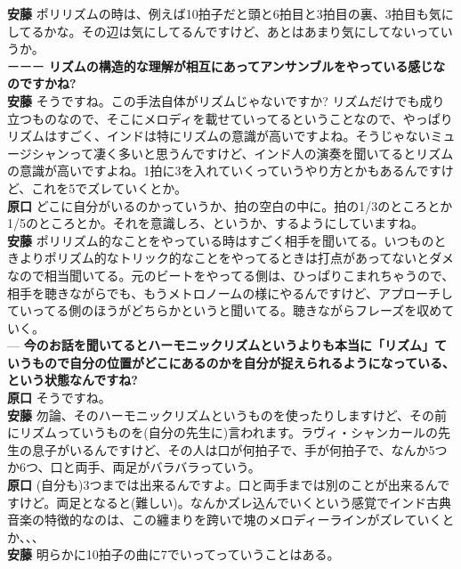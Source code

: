 \documentclass[uplatex,dvipdfmx]{ujarticle}
\begin{document}
\begin{description}
{\bf 安藤} ポリリズムの時は、例えば10拍子だと頭と6拍目と3拍目の裏、3拍目も気にしてるかな。その辺は気にしてるんですけど、あとはあまり気にしてないっていうか。\\

ーーー {\bf リズムの構造的な理解が相互にあってアンサンブルをやっている感じなのですかね?}\\

{\bf 安藤} そうですね。この手法自体がリズムじゃないですか? リズムだけでも成り立つものなので、そこにメロディを載せていってるということなので、やっぱりリズムはすごく、インドは特にリズムの意識が高いですよね。そうじゃないミュージシャンって凄く多いと思うんですけど、インド人の演奏を聞いてるとリズムの意識が高いですよね。1拍に3を入れていくっていうやり方とかもあるんですけど、これを5でズレていくとか。\\

{\bf 原口} どこに自分がいるのかっていうか、拍の空白の中に。拍の1/3のところとか1/5のところとか。それを意識しろ、というか、するようにしていますね。\\

{\bf 安藤} ポリリズム的なことをやっている時はすごく相手を聞いてる。いつものときよりポリズム的なトリック的なことをやってるときは打点があってないとダメなので相当聞いてる。元のビートをやってる側は、ひっぱりこまれちゃうので、相手を聴きながらでも、もうメトロノームの様にやるんですけど、アプローチしていってる側のほうがどちらかというと聞いてる。聴きながらフレーズを収めていく。\\

--- {\bf 今のお話を聞いてるとハーモニックリズムというよりも本当に「リズム」ていうもので自分の位置がどこにあるのかを自分が捉えられるようになっている、という状態なんですね?}\\

{\bf 原口} そうですね。\\

{\bf 安藤} 勿論、そのハーモニックリズムというものを使ったりしますけど、その前にリズムっていうものを(自分の先生に)言われます。ラヴィ・シャンカールの先生の息子がいるんですけど、その人は口が何拍子で、手が何拍子で、なんか5つか6つ、口と両手、両足がバラバラっていう。\\

{\bf 原口} (自分も)3つまでは出来るんですよ。口と両手までは別のことが出来るんですけど。両足となると(難しい)。なんかズレ込んでいくという感覚でインド古典音楽の特徴的なのは、この纏まりを跨いで塊のメロディーラインがズレていくとか、、、\\

{\bf 安藤} 明らかに10拍子の曲に7でいってっていうことはある。\\


\end{description}
\end{document}
